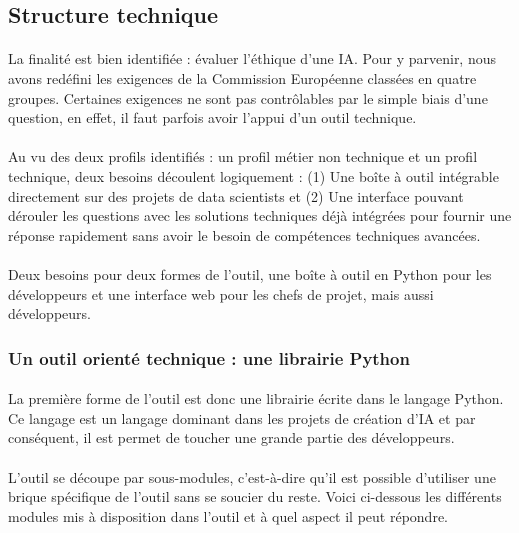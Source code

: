 \documentclass[10pt, french, a4paper]{report}
\begin{document}
\subsection{Structure technique}

\paragraph{}
La finalité est bien identifiée : évaluer l'éthique d'une IA. Pour y parvenir, nous avons redéfini les exigences de la Commission Européenne classées en quatre groupes. Certaines exigences ne sont pas contrôlables par le simple biais d'une question, en effet, il faut parfois avoir l'appui d'un outil technique. 

\paragraph{}
Au vu des deux profils identifiés : un profil métier non technique et un profil technique, deux besoins découlent logiquement : (1) Une boîte à outil intégrable directement sur des projets de data scientists et (2) Une interface pouvant dérouler les questions avec les solutions techniques déjà intégrées pour fournir une réponse rapidement sans avoir le besoin de compétences techniques avancées.

\paragraph{}
Deux besoins pour deux formes de l'outil, une boîte à outil en Python pour les développeurs et une interface web pour les chefs de projet, mais aussi développeurs.

\subsubsection{Un outil orienté technique : une librairie Python}

\paragraph{}
La première forme de l'outil est donc une librairie écrite dans le langage Python. Ce langage est un langage dominant dans les projets de création d'IA et par conséquent, il est permet de toucher une grande partie des développeurs. 

\paragraph{}
L'outil se découpe par sous-modules, c'est-à-dire qu'il est possible d'utiliser une brique spécifique de l'outil sans se soucier du reste. Voici ci-dessous les différents modules mis à disposition dans l'outil et à quel aspect il peut répondre.
\end{document}
